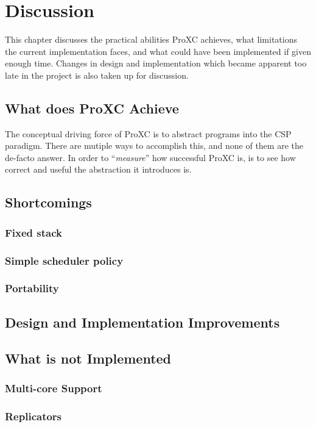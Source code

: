
\chapter{Discussion}
\label{ch:discussion}

This chapter discusses the practical abilities ProXC achieves, what limitations the current implementation faces, and what could have been implemented if given enough time. Changes in design and implementation which became apparent too late in the project is also taken up for discussion. 

\section{What does ProXC Achieve}

The conceptual driving force of ProXC is to abstract programs into the CSP paradigm. There are mutiple ways to accomplish this, and none of them are the de\hyp{}facto answer. In order to ``\textit{measure}'' how successful ProXC is, is to see how correct and useful the abstraction it introduces is. 

\section{Shortcomings}
\subsection{Fixed stack}
\subsection{Simple scheduler policy}
\subsection{Portability}
\label{sec:portability}



\section{Design and Implementation Improvements}



\section{What is not Implemented}
\subsection{Multi\hyp{}core Support}
\subsection{Replicators}



